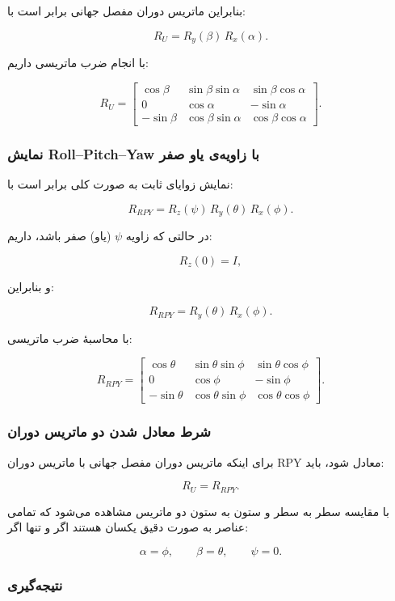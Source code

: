 \documentclass{article}
\begin{document}
بنابراین ماتریس دوران مفصل جهانی برابر است با:

\[
R_U = R_y(\beta)\, R_x(\alpha).
\]

با انجام ضرب ماتریسی داریم:

\[
R_U=
\begin{bmatrix}
	\cos\beta & \sin\beta\sin\alpha & \sin\beta\cos\alpha\\[4pt]
	0 & \cos\alpha & -\sin\alpha\\[4pt]
	-\sin\beta & \cos\beta\sin\alpha & \cos\beta\cos\alpha
\end{bmatrix}.
\]

\subsubsection{نمایش Roll--Pitch--Yaw با زاویه‌ی یاو صفر}

نمایش زوایای ثابت  به صورت کلی برابر است با:

\[
R_{RPY}=R_z(\psi)\,R_y(\theta)\,R_x(\phi).
\]

در حالتی که زاویه \(\psi\) (یاو) صفر باشد، داریم:

\[
R_z(0)=I,
\]

و بنابراین:

\[
R_{RPY} = R_y(\theta)\,R_x(\phi).
\]

با محاسبهٔ ضرب ماتریسی:

\[
R_{RPY}=
\begin{bmatrix}
	\cos\theta & \sin\theta\sin\phi & \sin\theta\cos\phi\\[4pt]
	0 & \cos\phi & -\sin\phi\\[4pt]
	-\sin\theta & \cos\theta\sin\phi & \cos\theta\cos\phi
\end{bmatrix}.
\]

\subsubsection{شرط معادل شدن دو ماتریس دوران}

برای اینکه ماتریس دوران مفصل جهانی با ماتریس دوران RPY معادل شود، باید:

\[
R_U = R_{RPY}.
\]

با مقایسه سطر به سطر و ستون به ستون دو ماتریس مشاهده می‌شود که تمامی عناصر به صورت دقیق یکسان هستند اگر و تنها اگر:

\[
\alpha = \phi, \qquad \beta = \theta, \qquad \psi = 0.
\]

\subsubsection{نتیجه‌گیری}
\end{document}

